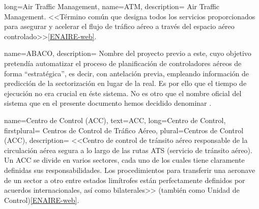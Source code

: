 \makeglossaries

%
%
%        
%

%
%
%        
%



{
    long={Air Traffic Management}, %
    name={ATM}, 
    description=
    {
       Air Traffic Management. <<Término común que designa todos los servicios proporcionados para asegurar y acelerar el flujo de tráfico 
       aéreo a través del espacio aéreo controlado>>\cref{ENAIRE-web}. 
    }
}

{
    name={ABACO},
    description=
    {   
        Nombre del proyecto previo a este, cuyo objetivo pretendía automatizar el proceso de planificación de controladores aéreos de forma ``estratégica'', es decir, con antelación previa, empleando información de predicción de la sectorización en lugar de la real. Es por ello que el tiempo de ejecución no era crucial en éste sistema.
        No es otro que el nombre oficial del sistema que en el presente documento hemos decidido denominar \legacy{}.
    }
}

{
    name={Centro de Control (ACC)},
    text={ACC},
	long={Centro de Control}, %
	firstplural= {Centros de Control de Tráfico Aéreo},
	plural={Centros de Control (ACC)},
    description=
    {
        <<Centro de control de tránsito aéreo responsable de la circulación aérea segura a lo largo de las rutas ATS 
        (servicio de tránsito aéreo). Un ACC se divide en varios sectores, cada uno de los cuales tiene claramente 
        definidas sus responsabilidades. Los procedimientos para transferir una aeronave de un sector a otro entre 
        estados limítrofes están perfectamente definidos por acuerdos internacionales, así como 
        bilaterales>> (también como Unidad de Control)\cref{ENAIRE-web}.
    }
}

